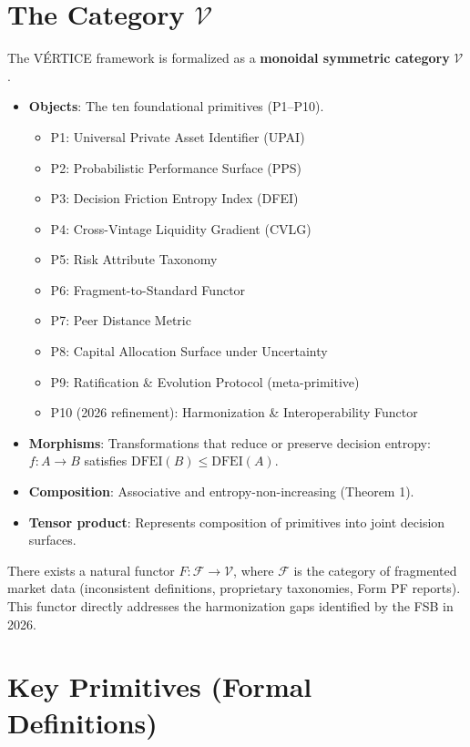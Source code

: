 \documentclass[11pt,a4paper]{article}
\begin{document}
\section{The Category $\mathcal{V}$}

The VÉRTICE framework is formalized as a \textbf{monoidal symmetric category} $\mathcal{V}$.

\begin{itemize}[leftmargin=*]
    \item \textbf{Objects}: The ten foundational primitives (P1--P10).
    \begin{itemize}
        \item P1: Universal Private Asset Identifier (UPAI)
        \item P2: Probabilistic Performance Surface (PPS)
        \item P3: Decision Friction Entropy Index (DFEI)
        \item P4: Cross-Vintage Liquidity Gradient (CVLG)
        \item P5: Risk Attribute Taxonomy
        \item P6: Fragment-to-Standard Functor
        \item P7: Peer Distance Metric
        \item P8: Capital Allocation Surface under Uncertainty
        \item P9: Ratification \& Evolution Protocol (meta-primitive)
        \item P10 (2026 refinement): Harmonization \& Interoperability Functor
    \end{itemize}
    \item \textbf{Morphisms}: Transformations that reduce or preserve decision entropy: $f: A \to B$ satisfies $\mathrm{DFEI}(B) \le \mathrm{DFEI}(A)$.
    \item \textbf{Composition}: Associative and entropy-non-increasing (Theorem 1).
    \item \textbf{Tensor product}: Represents composition of primitives into joint decision surfaces.
\end{itemize}

There exists a natural functor $F: \mathcal{F} \to \mathcal{V}$, where $\mathcal{F}$ is the category of fragmented market data (inconsistent definitions, proprietary taxonomies, Form PF reports). This functor directly addresses the harmonization gaps identified by the FSB in 2026.

\section{Key Primitives (Formal Definitions)}
\end{document}
